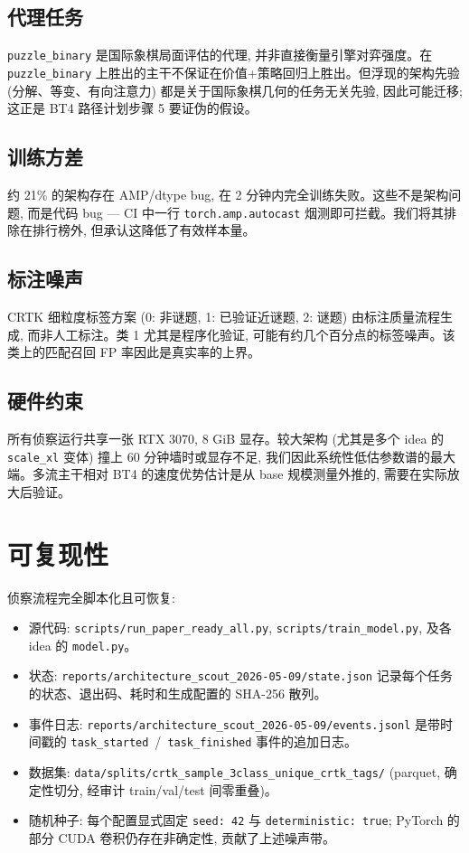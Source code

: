 \documentclass[10pt,a4paper]{article}
\begin{document}
\subsection*{代理任务}
\texttt{puzzle\_binary} 是国际象棋局面评估的代理, 并非直接衡量引擎对弈强度。在 \texttt{puzzle\_binary} 上胜出的主干不保证在价值+策略回归上胜出。但浮现的架构先验 (分解、等变、有向注意力) 都是关于国际象棋几何的任务无关先验, 因此可能迁移; 这正是 BT4 路径计划步骤 5 要证伪的假设。

\subsection*{训练方差}
约 21\% 的架构存在 AMP/dtype bug, 在 2 分钟内完全训练失败。这些不是架构问题, 而是代码 bug --- CI 中一行 \texttt{torch.amp.autocast} 烟测即可拦截。我们将其排除在排行榜外, 但承认这降低了有效样本量。

\subsection*{标注噪声}
CRTK 细粒度标签方案 (0: 非谜题, 1: 已验证近谜题, 2: 谜题) 由标注质量流程生成, 而非人工标注。类 1 尤其是程序化验证, 可能有约几个百分点的标签噪声。该类上的匹配召回 FP 率因此是真实率的上界。

\subsection*{硬件约束}
所有侦察运行共享一张 RTX 3070, 8 GiB 显存。较大架构 (尤其是多个 idea 的 \texttt{scale\_xl} 变体) 撞上 60 分钟墙时或显存不足, 我们因此系统性低估参数谱的最大端。多流主干相对 BT4 的速度优势估计是从 base 规模测量外推的, 需要在实际放大后验证。

\section{可复现性}

侦察流程完全脚本化且可恢复:
\begin{itemize}
\item 源代码: \texttt{scripts/run\_paper\_ready\_all.py}, \texttt{scripts/train\_model.py}, 及各 idea 的 \texttt{model.py}。
\item 状态: \texttt{reports/architecture\_scout\_2026-05-09/state.json} 记录每个任务的状态、退出码、耗时和生成配置的 SHA-256 散列。
\item 事件日志: \texttt{reports/architecture\_scout\_2026-05-09/events.jsonl} 是带时间戳的 \texttt{task\_started}~/~\texttt{task\_finished} 事件的追加日志。
\item 数据集: \texttt{data/splits/crtk\_sample\_3class\_unique\_crtk\_tags/} (parquet, 确定性切分, 经审计 train/val/test 间零重叠)。
\item 随机种子: 每个配置显式固定 \texttt{seed: 42} 与 \texttt{deterministic: true}; PyTorch 的部分 CUDA 卷积仍存在非确定性, 贡献了上述噪声带。
\end{itemize}
\end{document}
